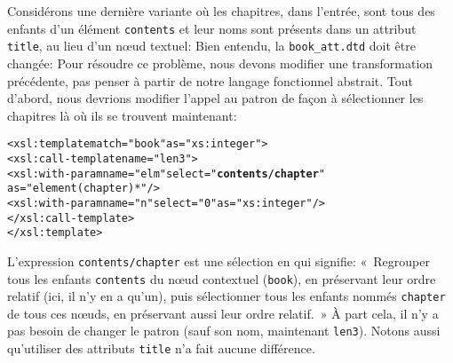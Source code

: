 Considérons une dernière variante où les chapitres, dans l'entrée,
sont tous des enfants d'un élément \texttt{contents} et leur noms sont
présents dans un attribut \texttt{title}, au lieu d'un nœud textuel:
\noindent Bien entendu, la \DTD \texttt{book\_att.dtd} doit être
changée: 
\noindent Pour résoudre ce problème, nous devons modifier une
transformation \XSLT précédente, pas penser à partir de notre langage
fonctionnel abstrait. Tout d'abord, nous devrions modifier l'appel au
patron de façon à sélectionner les chapitres là où ils se trouvent maintenant:
\begin{alltt}
\small  <xsl:template match="book" as="xs:integer">
    <xsl:call-template name="len3">
      <xsl:with-param name="elm" select="\textbf{contents/chapter}"
                                 as="element(chapter)*"/>
      <xsl:with-param name="n" select="0" as="xs:integer"/>
    </xsl:call-template>
  </xsl:template>
\end{alltt}
L'expression \texttt{contents/chapter} est une sélection en \XPath qui
signifie: «~Regrouper tous les enfants \texttt{contents} du nœud
contextuel (\texttt{book}), en préservant leur ordre relatif (ici, il
n'y en a qu'un), puis sélectionner tous les enfants nommés
\texttt{chapter} de tous ces nœuds, en préservant aussi leur ordre
relatif.~» À part cela, il n'y a pas besoin de changer le patron (sauf
son nom, maintenant \texttt{len3}). Notons aussi qu'utiliser des
attributs \texttt{title} n'a fait aucune différence.

